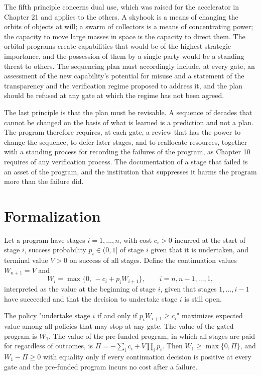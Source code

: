 The fifth principle concerns dual use, which was raised for the accelerator in Chapter 21 and applies to the others. A skyhook is a means of changing the orbits of objects at will; a swarm of collectors is a means of concentrating power; the capacity to move large masses in space is the capacity to direct them. The orbital programs create capabilities that would be of the highest strategic importance, and the possession of them by a single party would be a standing threat to others. The sequencing plan must accordingly include, at every gate, an assessment of the new capability's potential for misuse and a statement of the transparency and the verification regime proposed to address it, and the plan should be refused at any gate at which the regime has not been agreed.

The last principle is that the plan must be revisable. A sequence of decades that cannot be changed on the basis of what is learned is a prediction and not a plan. The program therefore requires, at each gate, a review that has the power to change the sequence, to defer later stages, and to reallocate resources, together with a standing process for recording the failures of the program, as Chapter 10 requires of any verification process. The documentation of a stage that failed is an asset of the program, and the institution that suppresses it harms the program more than the failure did.

\section*{Formalization}

Let a program have stages $i=1,\dots,n$, with cost $c_i>0$ incurred at the start of stage $i$, success probability $p_i\in(0,1]$ of stage $i$ given that it is undertaken, and terminal value $V>0$ on success of all stages. Define the continuation values $W_{n+1}=V$ and
\[
W_i=\max\{0,\,-c_i+p_iW_{i+1}\},\qquad i=n,n-1,\dots,1,
\]
interpreted as the value at the beginning of stage $i$, given that stages $1,\dots,i-1$ have succeeded and that the decision to undertake stage $i$ is still open.

\begin{proposition}
The policy "undertake stage $i$ if and only if $p_iW_{i+1}\ge c_i$" maximizes expected value among all policies that may stop at any gate. The value of the gated program is $W_1$. The value of the pre-funded program, in which all stages are paid for regardless of outcomes, is $\Pi=-\sum_ic_i+V\prod_ip_i$. Then $W_1\ge\max\{0,\Pi\}$, and $W_1-\Pi\ge0$ with equality only if every continuation decision is positive at every gate and the pre-funded program incurs no cost after a failure.
\end{proposition}

